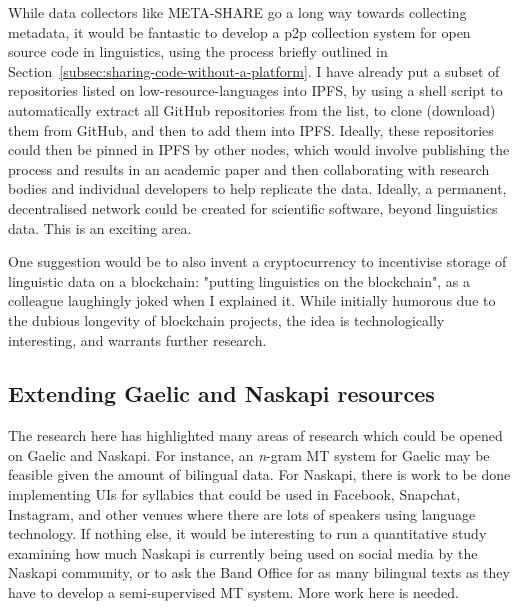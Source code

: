 While data collectors like META-SHARE go a long way towards collecting metadata, it would be fantastic to develop a p2p collection system for open source code in linguistics, using the process briefly outlined in Section~\ref{subsec:sharing-code-without-a-platform}. I have already put a subset of repositories listed on low-resource-languages into IPFS, by using a shell script to automatically extract all GitHub repositories from the list, to clone (download) them from GitHub, and then to add them into IPFS. Ideally, these repositories could then be pinned in IPFS by other nodes, which would involve publishing the process and results in an academic paper and then collaborating with research bodies and individual developers to help replicate the data. Ideally, a permanent, decentralised network could be created for scientific software, beyond linguistics data. This is an exciting area.

One suggestion would be to also invent a cryptocurrency to incentivise storage of linguistic data on a blockchain: "putting linguistics on the blockchain", as a colleague laughingly joked when I explained it. While initially humorous due to the dubious longevity of blockchain projects, the idea is technologically interesting, and warrants further research.

\subsection{Extending Gaelic and Naskapi resources}

The research here has highlighted many areas of research which could be opened on Gaelic and Naskapi. For instance, an \textit{n}-gram MT system for Gaelic may be feasible given the amount of bilingual data. For Naskapi, there is work to be done implementing UIs for syllabics that could be used in Facebook, Snapchat, Instagram, and other venues where there are lots of speakers using language technology. If nothing else, it would be interesting to run a quantitative study examining how much Naskapi is currently being used on social media by the Naskapi community, or to ask the Band Office for as many bilingual texts as they have to develop a semi-supervised MT system. More work here is needed.

%
%
%
%

